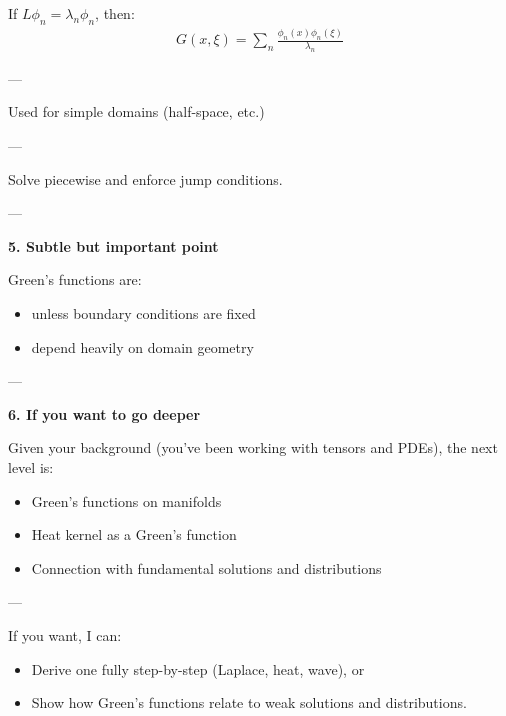 \documentclass[12pt,a4paper]{report}
\begin{document}
\begin{description}
\begin{description}
\begin{description}
If $L\phi_n = \lambda_n \phi_n$, then:
\begin{align*}
G(x,\xi) = \sum_n \frac{\phi_n(x)\phi_n(\xi)}{\lambda_n}
\end{align*}

---

\item {}

Used for simple domains (half-space, etc.)

---

\item {}

Solve piecewise and enforce jump conditions.

---
\end{description}

\item \textbf{5. Subtle but important point}

Green’s functions are:

\begin{itemize}
\item {} unless boundary conditions are fixed
\item depend heavily on domain geometry
\end{itemize}

---

\item \textbf{6. If you want to go deeper}

Given your background (you’ve been working with tensors and PDEs), the next level is:

\begin{itemize}
\item Green’s functions on manifolds
\item Heat kernel as a Green’s function
\item Connection with fundamental solutions and distributions
\end{itemize}

---
\end{description}

If you want, I can:

\begin{itemize}
\item Derive one fully step-by-step (Laplace, heat, wave), or
\item Show how Green’s functions relate to weak solutions and distributions.
\end{itemize}



\end{description}
\end{document}
